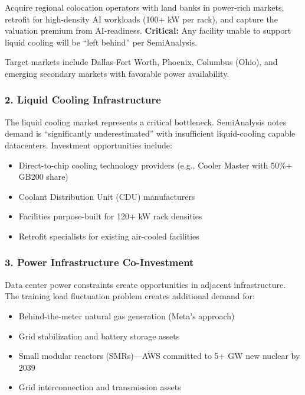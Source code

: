 \documentclass[11pt,a4paper]{article}
\begin{document}
Acquire regional colocation operators with land banks in power-rich markets, retrofit for high-density AI workloads (100+ kW per rack), and capture the valuation premium from AI-readiness. \textbf{Critical:} Any facility unable to support liquid cooling will be ``left behind'' per SemiAnalysis.

Target markets include Dallas-Fort Worth, Phoenix, Columbus (Ohio), and emerging secondary markets with favorable power availability.

\subsubsection{2. Liquid Cooling Infrastructure}

The liquid cooling market represents a critical bottleneck. SemiAnalysis notes demand is ``significantly underestimated'' with insufficient liquid-cooling capable datacenters. Investment opportunities include:

\begin{itemize}[leftmargin=*, itemsep=3pt]
    \item Direct-to-chip cooling technology providers (e.g., Cooler Master with 50\%+ GB200 share)
    \item Coolant Distribution Unit (CDU) manufacturers
    \item Facilities purpose-built for 120+ kW rack densities
    \item Retrofit specialists for existing air-cooled facilities
\end{itemize}

\subsubsection{3. Power Infrastructure Co-Investment}

Data center power constraints create opportunities in adjacent infrastructure. The training load fluctuation problem creates additional demand for:

\begin{itemize}[leftmargin=*, itemsep=3pt]
    \item Behind-the-meter natural gas generation (Meta's approach)
    \item Grid stabilization and battery storage assets
    \item Small modular reactors (SMRs)—AWS committed to 5+ GW new nuclear by 2039
    \item Grid interconnection and transmission assets
\end{itemize}
\end{document}
